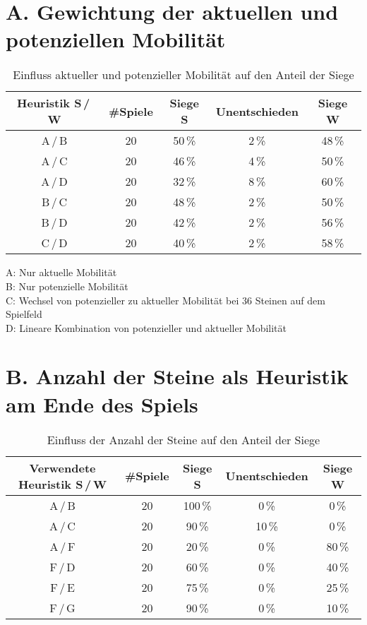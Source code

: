 
\addchap{\langanhang}

\section*{A. Gewichtung der aktuellen und potenziellen Mobilität}
 
\setcounter{table}{0}
\renewcommand{\thetable}{A\arabic{table}}

\begin{table}[hb]
\centering
\begin{tabular}{c|c|ccc}
\hline
Heuristik S\,/\,W & \#Spiele & Siege S & Unentschieden & Siege W \\
\hline
 A\,/\,B & 20 & 50\,\% &  2\,\% & 48\,\% \\
 A\,/\,C & 20 & 46\,\% &  4\,\% & 50\,\% \\
 A\,/\,D & 20 & 32\,\% &  8\,\% & 60\,\% \\
 B\,/\,C & 20 & 48\,\% &  2\,\% & 50\,\% \\
 B\,/\,D & 20 & 42\,\% &  2\,\% & 56\,\% \\
 C\,/\,D & 20 & 40\,\% &  2\,\% & 58\,\% \\
\hline
\end{tabular}
\caption{Einfluss aktueller und potenzieller Mobilität auf den Anteil der Siege}
\label{table:mobility}
\end{table}

\small{
A: Nur aktuelle Mobilität \\
B: Nur potenzielle Mobilität \\
C: Wechsel von potenzieller zu aktueller Mobilität bei 36 Steinen auf dem Spielfeld \\
D: Lineare Kombination von potenzieller und aktueller Mobilität}

\pagebreak

\section*{B. Anzahl der Steine als Heuristik am Ende des Spiels}
 
\setcounter{table}{0}
\renewcommand{\thetable}{B\arabic{table}}

\begin{table}[hb]
\centering
\begin{tabular}{c|c|ccc}
\hline
Verwendete Heuristik S\,/\,W & \#Spiele & Siege S & Unentschieden & Siege W \\
\hline
 A\,/\,B & 20 &100\,\% &  0\,\% &  0\,\% \\
 A\,/\,C & 20 & 90\,\% & 10\,\% &  0\,\% \\
 A\,/\,F & 20 & 20\,\% &  0\,\% & 80\,\% \\
 F\,/\,D & 20 & 60\,\% &  0\,\% & 40\,\% \\
 F\,/\,E & 20 & 75\,\% &  0\,\% & 25\,\% \\
 F\,/\,G & 20 & 90\,\% &  0\,\% & 10\,\% \\
\hline
\end{tabular}
\caption{Einfluss der Anzahl der Steine auf den Anteil der Siege}
\label{table:disccount}
\end{table}

